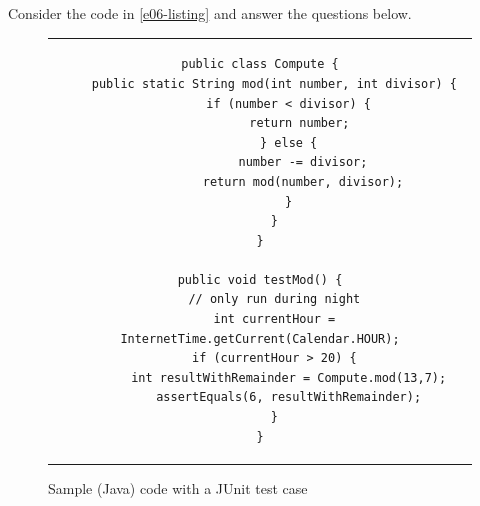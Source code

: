 \documentclass [11pt, a4wide, twoside]{article}
\begin{document}
\newpage

Consider the code in \autoref{e06-listing} and answer the questions below.

\begin{figure}[thp]
\centering
\begin{tabular}{c}
\definecolor{violet}{RGB}{255,0,0}
\lstset{language=}
\begin{lstlisting}
public class Compute {
	public static String mod(int number, int divisor) {
		if (number < divisor) {
			return number; 
		} else {
			number -= divisor;
			return mod(number, divisor);
		}
	}
}

public void testMod() {
	// only run during night
	int currentHour = InternetTime.getCurrent(Calendar.HOUR);
	if (currentHour > 20) {
		int resultWithRemainder = Compute.mod(13,7);
		assertEquals(6, resultWithRemainder);
	}
}
\end{lstlisting}
\end{tabular}
\vspace{-0.2cm}
\caption{Sample (Java) code with a JUnit test case}
\label{e06-listing}
\end{figure}
\end{document}
